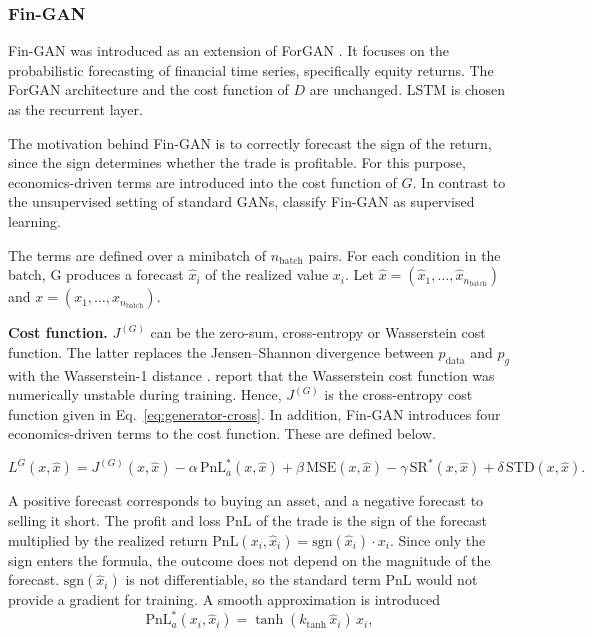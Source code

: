 \clearpage
\subsubsection{Fin-GAN}\label{sec:fin-gan}
Fin-GAN was introduced as an extension of ForGAN \parencite{vuleticFinGANForecastingClassifying2024}. It focuses on the probabilistic forecasting of financial time series, specifically equity returns. The ForGAN architecture and the cost function of $D$ are unchanged. LSTM is chosen as the recurrent layer. 

The motivation behind Fin-GAN is to correctly forecast the sign of the return, since the sign determines whether the trade is profitable. For this purpose, economics-driven terms are introduced into the cost function of $G$. In contrast to the unsupervised setting of standard GANs, \textcite{vuleticFinGANForecastingClassifying2024} classify Fin-GAN as supervised learning.

The terms are defined over a minibatch of $n_{\text{batch}}$ pairs. For each condition in the batch, G produces a forecast $\hat{x}_i$ of the realized value $x_i$. Let $\hat{x}=(\hat{x}_1, \ldots, \hat{x}_{n_{\text{batch}}})$ and $x=(x_1, \ldots, x_{n_{\text{batch}}})$. 

\textbf{Cost function.} $J^{(G)}$ can be the zero-sum, cross-entropy or Wasserstein cost function. The latter replaces the Jensen–Shannon divergence between $p_{\mathrm{data}}$ and $p_g$ with the Wasserstein-1 distance \parencite{arjovskyWassersteinGAN2017}. \textcite{vuleticFinGANForecastingClassifying2024} report that the Wasserstein cost function was numerically unstable during training. Hence, $J^{(G)}$ is the cross-entropy cost function given in Eq.~\eqref{eq:generator-cross}. In addition, Fin-GAN introduces four economics-driven terms to the cost function. These are defined below. 

\begin{equation}
L^{G}(x, \hat{x}) = J^{(G)}(x, \hat{x})
- \alpha\,\mathrm{PnL}^{*}_{a}(x, \hat{x})
+ \beta\,\mathrm{MSE}(x, \hat{x})
- \gamma\,\mathrm{SR}^{*}(x, \hat{x})
+ \delta\,\mathrm{STD}(x, \hat{x}).
\label{eq:fingan-loss}
\end{equation}

A positive forecast corresponds to buying an asset, and a negative forecast to selling it short. The profit and loss $\mathrm{PnL}$ of the trade is the sign of the forecast multiplied by the realized return $\mathrm{PnL}(x_i, \hat{x}_i)=\mathrm{sgn}(\hat{x}_i)\cdot x_i$. Since only the sign enters the formula, the outcome does not depend on the magnitude of the forecast. $\mathrm{sgn}(\hat{x}_i)$ is not differentiable, so the standard term $\mathrm{PnL}$ would not provide a gradient for training. A smooth approximation is introduced
\begin{equation}
\mathrm{PnL}^{*}_{a}(x_i, \hat{x}_i) = \tanh(k_{\tanh}\,\hat{x}_i)\,x_i,
\end{equation}

